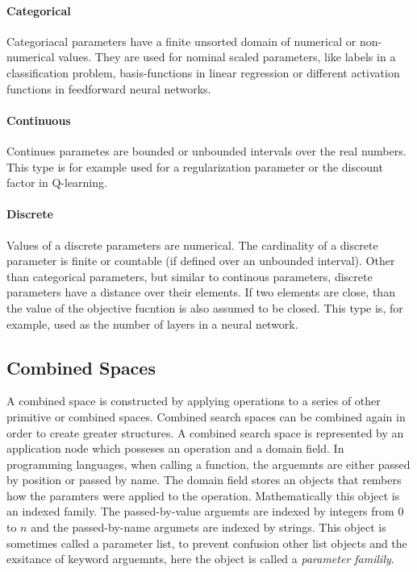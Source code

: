 \documentclass[english]{article}
\begin{document}

\paragraph{Categorical}
Categoriacal parameters have a finite unsorted domain of numerical or non-numerical values. They are used for nominal scaled parameters, like labels in a classification problem, basis-functions in linear regression or different activation functions in feedforward neural networks.

\paragraph{Continuous}
Continues parametes are bounded or unbounded intervals over the real numbers. This type is for example used for a regularization parameter or the discount factor in Q-learning.

\paragraph{Discrete}
Values of a discrete parameters are numerical. The cardinality of a discrete parameter is finite or countable (if defined over an unbounded interval).
Other than categorical parameters, but similar to continous parameters, discrete parameters have a distance over their elements. If two elements are close, than the value of the objective fucntion is also assumed to be closed. This type is, for example, used as the number of layers in a neural network.

\subsection{Combined Spaces}
A combined space is constructed by applying operations to a series of other primitive or combined spaces. Combined search spaces can be combined again in order to create greater structures. A combined search space is represented by an application node which posseses an operation and a domain field. In programming languages, when calling a function, the arguemnts are either passed by position or passed by name. The domain field stores an objects that rembers how the paramters were applied to the operation. Mathematically this object is an indexed family. The passed-by-value arguemts are indexed by integers from $0$ to $n$ and the passed-by-name argumets are indexed by strings. This object is sometimes called a parameter list, to prevent confusion other list objects and the exsitance of keyword arguemnts, here the object is called a \textit{parameter familily}.
\end{document}
